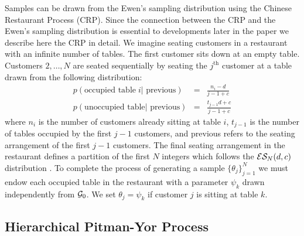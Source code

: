 Samples can be drawn from the Ewen's sampling distribution using the Chinese Restaurant Process (CRP).  Since the connection between the CRP and the Ewen's sampling distribution is essential to developments later in the paper we describe here the CRP in detail. We imagine seating customers in a restaurant with an infinite number of tables. The first customer sits down at an empty table.  Customers $2, \dots ,N$ are seated sequentially by seating the $j^{\mathrm{th}}$ customer at a table drawn from the following distribution:
%
\[
\begin{array}{lcl}
p(\textrm{occupied table}\; i |\textrm{ previous}) &=& \frac{n_i - d}{j-1+ c}\\
p(\textrm{unoccupied table} | \textrm{ previous}) &=& \frac{t_{j-1}d +c}{j-1+c}
\end{array}
\]
%
where $n_i$ is the number of customers already sitting at table $i$, $t_{j-1}$ is the number of tables occupied by the first $j-1$ customers, and previous refers to the seating arrangement of the first $j-1$ customers.  The final seating arrangement in the restaurant defines a partition of the first $N$ integers which follows the $\ES_N(d,c)$ distribution \cite{Pitman1995}.  To complete the process of generating a sample $\{ \theta_j \}_{j = 1}^N$ we must endow each occupied table in the restaurant with a parameter $\psi_k$ drawn independently from $\G_0$.  We set $\theta_j = \psi_k$ if customer $j$ is sitting at table $k$.

\subsection{Hierarchical Pitman-Yor Process}

